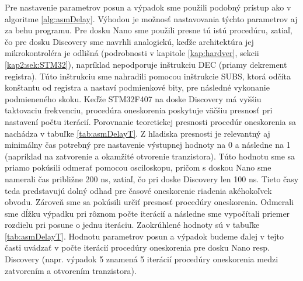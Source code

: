 Pre nastavenie parametrov posun a výpadok sme použili podobný prístup ako v algoritme \ref{alg:asmDelay}. Výhodou je možnosť nastavovania týchto parametrov aj za behu programu. Pre dosku Nano sme použili presne tú istú procedúru, zatiaľ, čo pre dosku Discovery sme navrhli analogickú, keďže architektúra jej mikrokontroléra je odlišná (podrobnosti v kapitole \ref{kap:hardver}, sekcii \ref{kap2:sek:STM32}), napríklad nepodporuje inštrukciu DEC (priamy dekrement registra). Túto inštrukciu sme nahradili pomocou inštrukcie SUBS, ktorá odčíta konštantu od registra a nastaví podmienkové bity, pre následné vykonanie podmieneného skoku. Keďže STM32F407 na doske Discovery má vyššiu taktovaciu frekvenciu, procedúra oneskorenia poskytuje väčšiu presnosť pri nastavení počtu iterácií. Porovnanie teoretickej presnosti procedúr oneskorenia sa nachádza v tabuľke \ref{tab:asmDelayT}. Z hľadiska presnosti je relevantný aj minimálny čas potrebný pre nastavenie výstupnej hodnoty na 0 a následne na 1 (napríklad na zatvorenie a okamžité otvorenie tranzistora). Túto hodnotu sme sa priamo pokúsili odmerať pomocou osciloskopu, pričom s doskou Nano sme namerali čas približne 200 ns, zatiaľ, čo pri doske Discovery len 100 ns. Tieto časy teda predstavujú dolný odhad pre časové oneskorenie riadenia akéhokoľvek obvodu. Zároveň sme sa pokúsili určiť presnosť procedúry oneskorenia. Odmerali sme dĺžku výpadku pri rôznom počte iterácií a následne sme vypočítali priemer rozdielu pri posune o jednu iteráciu. Zaokrúhlené hodnoty sú v tabuľke \ref{tab:asmDelayT}. Hodnotu parametrov posun a výpadok budeme ďalej v tejto časti uvádzať v počte iterácií procedúry oneskorenia pre dosku Nano resp. Discovery (napr. výpadok 5 znamená 5 iterácií procedúry oneskorenia medzi zatvorením a otvorením tranzistora).

